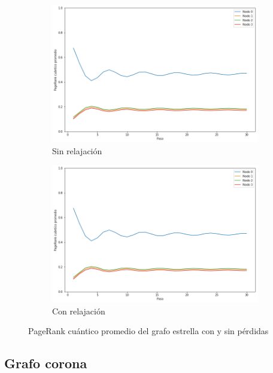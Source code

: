 \begin{figure}[H]
    \centering
    \begin{subfigure}[m]{0.45\textwidth}
        \centering
        \includegraphics[width=0.9\linewidth]{img/star-mean-lossless.png}
        \caption{Sin relajación}
    \end{subfigure}
    \begin{subfigure}[m]{0.45\textwidth}
        \centering
        \includegraphics[width=0.9\linewidth]{img/star-mean-lossy.png}
        \caption{Con relajación}
    \end{subfigure}
    \caption[PageRank cuántico promedio del grafo estrella con y sin pérdidas]{PageRank cuántico promedio del grafo estrella con y sin pérdidas}
    \label{fig:meanstarlossy}
\end{figure}

\subsection{Grafo corona}

